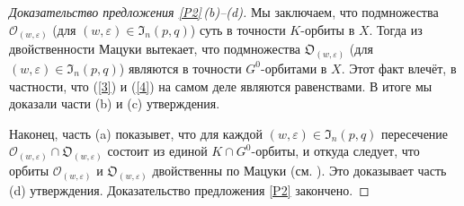 \documentclass{amsart}
\theoremstyle{definition}
\begin{document}
\begin{proof}[Доказательство предложения \ref{P2}\,{\rm (b)}--{\rm (d)}]
Мы заключаем, что подмножества $\mathcal{O}_{(w,\varepsilon)}$ (для
$(w,\varepsilon)\in\mathfrak{I}_n(p,q)$) суть в точности $K$-орбиты
в $X$. Тогда из двойственности Мацуки вытекает, что подмножества
$\mathfrak{O}_{(w,\varepsilon)}$ (для
$(w,\varepsilon)\in\mathfrak{I}_n(p,q)$) являются в точности
$G^0$-орбитами в $X$. Этот факт влечёт, в частности, что (\ref{3}) и (\ref{4}) на самом деле являются равенствами. В итоге мы доказали части {\rm (b)} и {\rm (c)} утверждения.

Наконец, часть {\rm (a)} показывет, что для каждой
$(w,\varepsilon)\in\mathfrak{I}_n(p,q)$ пересечение
$\mathcal{O}_{(w,\varepsilon)}\cap\mathfrak{O}_{(w,\varepsilon)}$
состоит из единой $K\cap G^0$-орбиты, и откуда следует, что орбиты  $\mathcal{O}_{(w,\varepsilon)}$ и
$\mathfrak{O}_{(w,\varepsilon)}$ двойственны по Мацуки (см.
\cite{Matsuki,Matsuki3}). Это доказывает часть {\rm (d)} утверждения. Доказательство предложения \ref{P2} закончено.
\end{proof}
\end{document}
